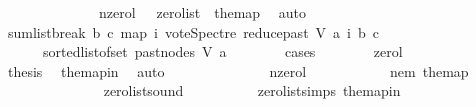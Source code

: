 \begin{isabellebody}
\ \ \ \ \ \ \ \ \ \ \ \ \ \ {\isacharparenleft}{\kern0pt}n{\isacharunderscore}{\kern0pt}zero{\isacharunderscore}{\kern0pt}l{\isacharparenright}{\kern0pt}\ {\isachardoublequoteopen}\ {\isasymnot}\ zero{\isacharunderscore}{\kern0pt}list\ \ the{\isacharunderscore}{\kern0pt}map{\isachardoublequoteclose}\ \isamarkupfalse%
\ auto\isanewline
\ \ \ \ \ \isamarkupfalse%
\ \isamarkupfalse%
\ {\isachardoublequoteopen}sumlist{\isacharunderscore}{\kern0pt}break\ b\ c\ {\isacharparenleft}{\kern0pt}map\ {\isacharparenleft}{\kern0pt}{\isasymlambda}i{\isachardot}{\kern0pt}\ vote{\isacharunderscore}{\kern0pt}Spectre\ {\isacharparenleft}{\kern0pt}reduce{\isacharunderscore}{\kern0pt}past\ V\ a{\isacharparenright}{\kern0pt}\ i\ b\ c{\isacharparenright}{\kern0pt}\ \isanewline
\ \ \ \ \ \ {\isacharparenleft}{\kern0pt}sorted{\isacharunderscore}{\kern0pt}list{\isacharunderscore}{\kern0pt}of{\isacharunderscore}{\kern0pt}set\ {\isacharparenleft}{\kern0pt}past{\isacharunderscore}{\kern0pt}nodes\ V\ a{\isacharparenright}{\kern0pt}{\isacharparenright}{\kern0pt}{\isacharparenright}{\kern0pt}\ {\isasymin}\ {\isacharbraceleft}{\kern0pt}{}{\isacharcomma}{\kern0pt}{}{\isacharbraceright}{\kern0pt}{\isachardoublequoteclose}\isanewline
\ \ \ \ \ \isamarkupfalse%
{\isacharparenleft}{\kern0pt}cases{\isacharparenright}{\kern0pt}\isanewline
\ \ \ \ \ \ \isamarkupfalse%
\ zero{\isacharunderscore}{\kern0pt}l\isanewline
\ \ \ \ \ \ \isamarkupfalse%
\ \isamarkupfalse%
\ {\isacharquery}{\kern0pt}thesis\ \isamarkupfalse%
\ the{\isacharunderscore}{\kern0pt}map{\isacharunderscore}{\kern0pt}in\ \isamarkupfalse%
\ auto\isanewline
\ \ \ \ \isamarkupfalse%
\isanewline
\ \ \ \ \ \ \ \ \isamarkupfalse%
\ n{\isacharunderscore}{\kern0pt}zero{\isacharunderscore}{\kern0pt}l\isanewline
\ \ \ \ \ \ \ \ \isamarkupfalse%
\ \isamarkupfalse%
\ nem{\isacharcolon}{\kern0pt}\ {\isachardoublequoteopen}the{\isacharunderscore}{\kern0pt}map\isanewline
\ \ \ \ \ \ \ \ \ \ \ {\isasymnoteq}\ {\isacharbrackleft}{\kern0pt}{\isacharbrackright}{\kern0pt}{\isachardoublequoteclose}\ \isamarkupfalse%
\ zero{\isacharunderscore}{\kern0pt}list{\isacharunderscore}{\kern0pt}sound\isanewline
\ \ \ \ \ \ \ \ \ \ zero{\isacharunderscore}{\kern0pt}list{\isachardot}{\kern0pt}simps{\isacharparenleft}{\kern0pt}{}{\isacharparenright}{\kern0pt}\ the{\isacharunderscore}{\kern0pt}map{\isacharunderscore}{\kern0pt}in\isanewline

\end{isabellebody}
